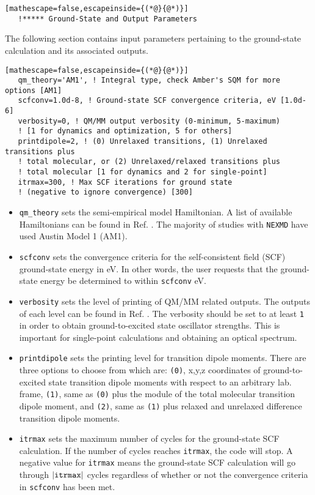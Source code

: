\begin{lstlisting}[mathescape=false,escapeinside={(*@}{@*)}]
   !***** Ground-State and Output Parameters
\end{lstlisting}
\noindent The following section contains input parameters pertaining to the ground-state calculation and its associated outputs.
\begin{lstlisting}[mathescape=false,escapeinside={(*@}{@*)}]
   qm_theory='AM1', ! Integral type, check Amber's SQM for more options [AM1]
   scfconv=1.0d-8, ! Ground-state SCF convergence criteria, eV [1.0d-6]
   verbosity=0, ! QM/MM output verbosity (0-minimum, 5-maximum) 
   ! [1 for dynamics and optimization, 5 for others]
   printdipole=2, ! (0) Unrelaxed transitions, (1) Unrelaxed transitions plus 
   ! total molecular, or (2) Unrelaxed/relaxed transitions plus 
   ! total molecular [1 for dynamics and 2 for single-point]
   itrmax=300, ! Max SCF iterations for ground state 
   ! (negative to ignore convergence) [300]
\end{lstlisting}
 \begin{itemize}
\item \verb+qm_theory+ sets the semi-empirical model Hamiltonian.  A list of available Hamiltonians can be found in Ref. \cite{amber2017}.  The majority of studies with \verb+NEXMD+ have used Austin Model 1 (AM1).  
\item \verb+scfconv+ sets the convergence criteria for the self-consistent field (SCF) ground-state energy in eV. In other words, the user requests that the ground-state energy be determined to within \verb+scfconv+ eV.
\item \verb+verbosity+ sets the level of printing of QM/MM related outputs.  The outputs of each level can be found in Ref. \cite{amber2017}.  The verbosity should be set to at least \verb+1+ in order to obtain ground-to-excited state oscillator strengths.  This is important for single-point calculations and obtaining an optical spectrum.%
\item \verb+printdipole+ sets the printing level for transition dipole moments.  There are three options to choose from which are: \verb+(0)+, x,y,z coordinates of ground-to-excited state transition dipole moments with respect to an arbitrary lab. frame, \verb+(1)+, same as \verb+(0)+ plus the module of the total molecular transition dipole moment, and \verb+(2)+, same as \verb+(1)+ plus relaxed and unrelaxed difference transition dipole moments.
\item \verb+itrmax+ sets the maximum number of cycles for the ground-state SCF calculation.  If the number of cycles reaches \verb+itrmax+, the code will stop.  A negative value for \verb+itrmax+ means the ground-state SCF calculation will go through $\left|\verb+itrmax+\right|$ cycles regardless of whether or not the convergence criteria in \verb+scfconv+ has been met.
\end{itemize}

